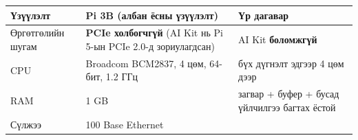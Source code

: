 \begingroup\scriptsize\begin{longtable}[]{@{}lll@{}}
\toprule
\begin{minipage}[b]{0.30\columnwidth}\raggedright
Үзүүлэлт\strut
\end{minipage} & \begin{minipage}[b]{0.30\columnwidth}\raggedright
Pi 3B (албан ёсны үзүүлэлт)\strut
\end{minipage} & \begin{minipage}[b]{0.30\columnwidth}\raggedright
Үр дагавар\strut
\end{minipage}\tabularnewline
\midrule
\endhead
\begin{minipage}[t]{0.30\columnwidth}\raggedright
Өргөтгөлийн шугам\strut
\end{minipage} & \begin{minipage}[t]{0.30\columnwidth}\raggedright
\textbf{PCIe холбогчгүй} (AI Kit нь Pi 5-ын PCIe 2.0-д зориулагдсан)\strut
\end{minipage} & \begin{minipage}[t]{0.30\columnwidth}\raggedright
AI Kit \textbf{боломжгүй}\strut
\end{minipage}\tabularnewline
\begin{minipage}[t]{0.30\columnwidth}\raggedright
CPU\strut
\end{minipage} & \begin{minipage}[t]{0.30\columnwidth}\raggedright
Broadcom BCM2837, 4 цөм, 64-бит, 1.2 ГГц\strut
\end{minipage} & \begin{minipage}[t]{0.30\columnwidth}\raggedright
бүх дүгнэлт эдгээр 4 цөм дээр\strut
\end{minipage}\tabularnewline
\begin{minipage}[t]{0.30\columnwidth}\raggedright
RAM\strut
\end{minipage} & \begin{minipage}[t]{0.30\columnwidth}\raggedright
1 GB\strut
\end{minipage} & \begin{minipage}[t]{0.30\columnwidth}\raggedright
загвар + буфер + бусад үйлчилгээ багтах ёстой\strut
\end{minipage}\tabularnewline
\begin{minipage}[t]{0.30\columnwidth}\raggedright
Сүлжээ\strut
\end{minipage} & \begin{minipage}[t]{0.30\columnwidth}\raggedright
100 Base Ethernet\strut
\end{minipage} & \begin{minipage}[t]{0.30\columnwidth}\raggedright

\end{minipage}
\end{longtable}
